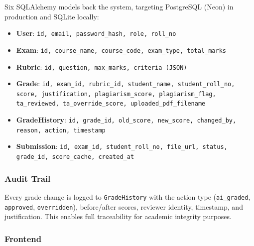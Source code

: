 \documentclass[12pt,a4paper]{article}
\begin{document}
Six SQLAlchemy models back the system, targeting PostgreSQL (Neon) in production and SQLite locally:

\begin{itemize}[noitemsep]
  \item \textbf{User}: \texttt{id, email, password\_hash, role, roll\_no}
  \item \textbf{Exam}: \texttt{id, course\_name, course\_code, exam\_type, total\_marks}
  \item \textbf{Rubric}: \texttt{id, question, max\_marks, criteria (JSON)}
  \item \textbf{Grade}: \texttt{id, exam\_id, rubric\_id, student\_name, student\_roll\_no, score, justification, plagiarism\_score, plagiarism\_flag, ta\_reviewed, ta\_override\_score, uploaded\_pdf\_filename}
  \item \textbf{GradeHistory}: \texttt{id, grade\_id, old\_score, new\_score, changed\_by, reason, action, timestamp}
  \item \textbf{Submission}: \texttt{id, exam\_id, student\_roll\_no, file\_url, status, grade\_id, score\_cache, created\_at}
\end{itemize}

\subsubsection{Audit Trail}

Every grade change is logged to \texttt{GradeHistory} with the action type (\texttt{ai\_graded}, \texttt{approved}, \texttt{overridden}), before/after scores, reviewer identity, timestamp, and justification. This enables full traceability for academic integrity purposes.

\subsubsection{Frontend}
\end{document}
